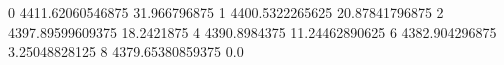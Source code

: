 0 4411.62060546875 31.966796875
1 4400.5322265625 20.87841796875
2 4397.89599609375 18.2421875
4 4390.8984375 11.24462890625
6 4382.904296875 3.25048828125
8 4379.65380859375 0.0
